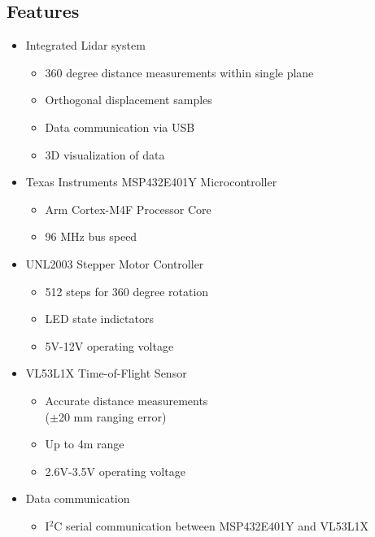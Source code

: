 \documentclass[12pt]{article}
\begin{document}
\begin{paracol}{2}
    \subsection*{Features}
    \begin{itemize}[nosep]
        \item Integrated Lidar system 
        \begin{itemize}[nosep]
            \item 360 degree distance measurements within single plane
            \item Orthogonal displacement samples
            \item Data communication via USB
            \item 3D visualization of data
        \end{itemize} 
        \item Texas Instruments MSP432E401Y Microcontroller 
        \begin{itemize}[nosep]
            \item Arm Cortex-M4F Processor Core 
            \item 96 MHz bus speed
        \end{itemize}
        \item UNL2003 Stepper Motor Controller
        \begin{itemize}[nosep]
            \item 512 steps for 360 degree rotation
            \item LED state indictators
            \item 5V-12V operating voltage
        \end{itemize}
        \item VL53L1X Time-of-Flight Sensor
        \begin{itemize}[nosep]
            \item Accurate distance measurements \\ ($\pm$20 mm ranging error)
            \item Up to 4m range
            \item 2.6V-3.5V operating voltage
        \end{itemize}
        \item Data communication
        \begin{itemize}[nosep]
            \item I$^2$C serial communication between MSP432E401Y and VL53L1X

\end{itemize}
\end{itemize}
\end{paracol}
\end{document}
